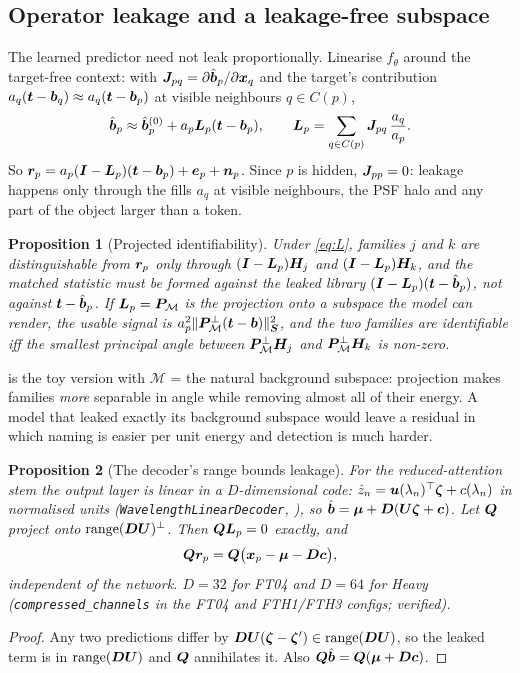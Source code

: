 \documentclass[11pt,a4paper]{article}
\theoremstyle{plain}
\newtheorem{proposition}{Proposition}[section]
\theoremstyle{definition}
\theoremstyle{remark}
\newcommand{\rng}{\operatorname{range}}
\newcommand{\x}{\B{x}}
\newcommand{\bvec}{\B{b}}
\newcommand{\bh}{\hat{\B{b}}}
\newcommand{\tv}{\B{t}}
\newcommand{\rv}{\B{r}}
\newcommand{\ev}{\B{e}}
\newcommand{\nv}{\B{n}}
\newcommand{\Sm}{\B{S}}
\newcommand{\Um}{\B{U}}
\newcommand{\Hm}{\B{H}}
\newcommand{\Pm}{\B{P}}
\newcommand{\Lm}{\B{L}}
\newcommand{\Dm}{\B{D}}
\newcommand{\Id}{\B{I}}
\newcommand{\nrm}[1]{\lVert #1\rVert}
\begin{document}
\subsection{Operator leakage and a leakage-free subspace}

The learned predictor need not leak proportionally. Linearise $f_\theta$ around the target-free context: with
$\B J_{pq}=\partial\bh_p/\partial\x_q$ and the target's contribution $a_q(\tv-\bvec_q)\approx a_q(\tv-\bvec_p)$ at visible
neighbours $q\in C(p)$,
\begin{equation}
  \bh_p\approx\bh_p^{(0)}+a_p\Lm_p(\tv-\bvec_p),\qquad \Lm_p=\sum_{q\in C(p)}\B J_{pq}\,\frac{a_q}{a_p}.
  \label{eq:L}
\end{equation}
So $\rv_p=a_p(\Id-\Lm_p)(\tv-\bvec_p)+\ev_p+\nv_p$. Since $p$ is hidden, $\bm{J}_{pp}=0$: leakage happens only through
the fills $a_q$ at visible neighbours, the PSF halo and any part of the object larger than a token.

\begin{proposition}[Projected identifiability]
\label{prop:ident}
Under \eqref{eq:L}, families $j$ and $k$ are distinguishable from $\rv_p$ only through $(\Id-\Lm_p)\Hm_j$ and
$(\Id-\Lm_p)\Hm_k$, and the matched statistic must be formed against the leaked library
$(\Id-\Lm_p)(\tv-\bh_p)$, not against $\tv-\bh_p$. If $\Lm_p=\Pm_{\mathcal M}$ is the projection onto a subspace the model can
render, the usable signal is $a_p^2\nrm{\Pm^\perp_{\mathcal M}(\tv-\bvec)}^2_{\Sm}$, and the two families are identifiable
iff the smallest principal angle between $\Pm^\perp_{\mathcal M}\Hm_j$ and $\Pm^\perp_{\mathcal M}\Hm_k$ is non-zero.
\end{proposition}

 is the toy version with $\mathcal M$ = the natural background subspace: projection makes families
\emph{more} separable in angle while removing almost all of their energy. A model that leaked exactly its background
subspace would leave a residual in which naming is easier per unit energy and detection is much harder.

\begin{proposition}[The decoder's range bounds leakage]
\label{prop:range}
For the reduced-attention stem the output layer is linear in a $D$-dimensional code:
$\hat z_n=\bm{u}(\lambda_n)^\top\bm{\zeta}+c(\lambda_n)$ in normalised units
(\verb|WavelengthLinearDecoder|, ), so $\bh=\B\mu+\Dm(\Um\B\zeta+\B c)$. Let $\bm{Q}$ project
onto $\rng(\Dm\Um)^\perp$. Then $\B Q\Lm_p=0$ exactly, and
\[
  \B Q\rv_p=\B Q\big(\x_p-\B\mu-\Dm\B c\big),
\]
independent of the network. $D=32$ for FT04 and $D=64$ for Heavy (\verb|compressed_channels| in the FT04 and FTH1/FTH3
configs; verified).
\end{proposition}
\begin{proof}
Any two predictions differ by $\Dm\Um(\B\zeta-\B\zeta')\in\rng(\Dm\Um)$, so the leaked term is in $\rng(\Dm\Um)$ and
$\bm{Q}$ annihilates it. Also $\B Q\bh=\B Q(\B\mu+\Dm\B c)$.
\end{proof}
\end{document}
